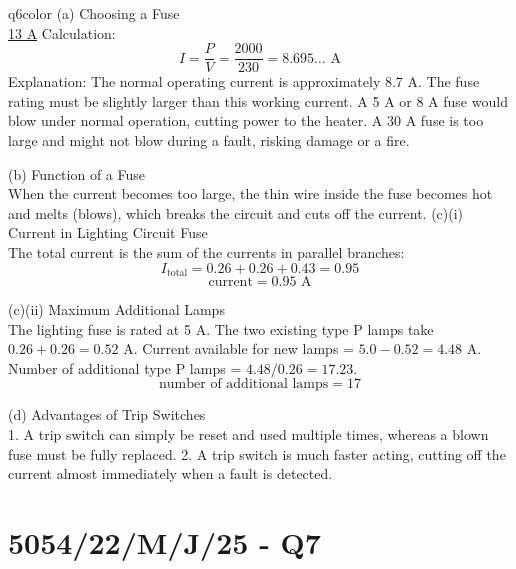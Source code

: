 \documentclass[11pt,a4paper]{article}
\newcommand{\qsection}[1]{\needspace{10\baselineskip}\section*{#1}}
\begin{document}
\begin{ansbox}{q6color}
(a) Choosing a Fuse\\[4pt]
\underline{13 A}
Calculation:
\[ I = \frac{P}{V} = \frac{2000}{230} = 8.695 \dots \text{ A} \]
Explanation: The normal operating current is approximately 8.7 A. The fuse rating must be slightly larger than this working current. A 5 A or 8 A fuse would blow under normal operation, cutting power to the heater. A 30 A fuse is too large and might not blow during a fault, risking damage or a fire.

\vspace{4pt}
(b) Function of a Fuse\\[4pt]
When the current becomes too large, the thin wire inside the fuse becomes hot and melts (blows), which breaks the circuit and cuts off the current.
\clearpage
\vspace{4pt}
(c)(i) Current in Lighting Circuit Fuse\\[4pt]
The total current is the sum of the currents in parallel branches:
\[ I_{\text{total}} = 0.26 + 0.26 + 0.43 = 0.95 \]
\[ \text{current} = \boxed{0.95 \text{ A}} \]

\vspace{4pt}
(c)(ii) Maximum Additional Lamps\\[4pt]
The lighting fuse is rated at 5 A.
The two existing type P lamps take $0.26 + 0.26 = 0.52 \text{ A}$.
Current available for new lamps = $5.0 - 0.52 = 4.48 \text{ A}$.
Number of additional type P lamps = $4.48 / 0.26 = 17.23$.
\[ \text{number of additional lamps} = \boxed{17} \]

\vspace{4pt}
(d) Advantages of Trip Switches\\[4pt]
1. A trip switch can simply be reset and used multiple times, whereas a blown fuse must be fully replaced.
2. A trip switch is much faster acting, cutting off the current almost immediately when a fault is detected.
\end{ansbox}
\qsection{5054/22/M/J/25 - Q7}\label{p2_mj25:q7}
\end{document}
